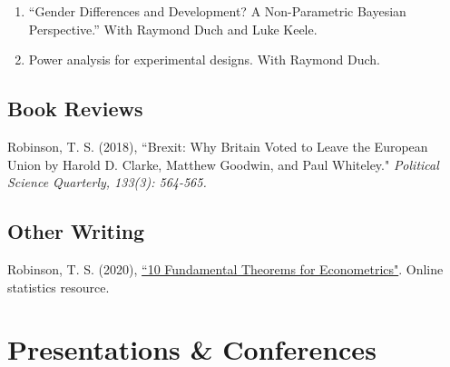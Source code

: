 \documentclass[11pt, a4paper]{article}
\begin{document}
\begin{enumerate}
\item ``Gender Differences and Development? A Non-Parametric Bayesian Perspective.'' With Raymond Duch and Luke Keele. 

\item Power analysis for experimental designs.  With Raymond Duch.
\end{enumerate}

 \subsection*{Book Reviews}

  Robinson, T. S. (2018), ``Brexit: Why Britain Voted to Leave the European Union by Harold D. Clarke, Matthew Goodwin, and Paul Whiteley."\textit{ Political Science Quarterly, 133(3): 564-565.}

  \subsection*{Other Writing}

  Robinson, T. S. (2020), \href{https://ts-robinson.com/10et/index.html}{``10 Fundamental Theorems for Econometrics"}. Online statistics resource.

 \section*{Presentations \& Conferences}
\end{document}
